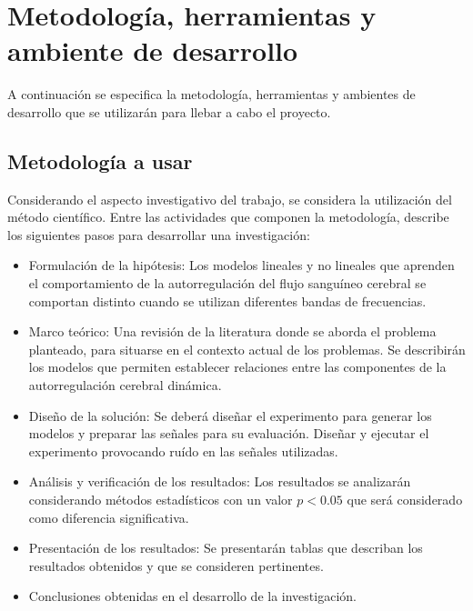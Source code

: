 \section{Metodología, herramientas y ambiente de desarrollo}
A continuación se especifica la metodología, herramientas y ambientes de desarrollo que se utilizarán para llebar a cabo el proyecto.

\subsection{Metodología a usar}
Considerando el aspecto investigativo del trabajo, se considera la utilización del método científico. Entre las actividades que componen la metodología, \cite{Sampieri2006} describe los siguientes pasos para desarrollar una investigación:

\begin{itemize}
    \item Formulación de la hipótesis: Los modelos lineales y no lineales que aprenden el comportamiento de la autorregulación del flujo sanguíneo cerebral se comportan distinto cuando se utilizan diferentes bandas de frecuencias.

    \item Marco teórico: Una revisión de la literatura donde se aborda el problema planteado, para situarse en el contexto actual de los problemas. Se describirán los modelos que permiten establecer relaciones entre las componentes de la autorregulación cerebral dinámica.

    \item Diseño de la solución: Se deberá diseñar el experimento para generar los modelos y preparar las señales para su evaluación. Diseñar y ejecutar el experimento provocando ruído en las señales utilizadas.

    \item Análisis y verificación de los resultados: Los resultados se analizarán considerando métodos estadísticos con un valor $p < 0.05$ que será considerado como diferencia significativa.

    \item Presentación de los resultados: Se presentarán tablas que describan los resultados obtenidos y que se consideren pertinentes.

    \item Conclusiones obtenidas en el desarrollo de la investigación.
\end{itemize}

